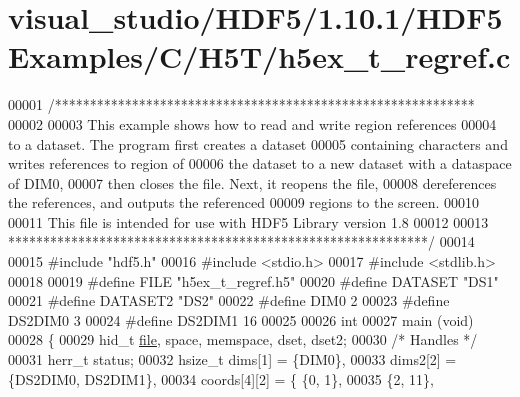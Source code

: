 \hypertarget{visual__studio_2_h_d_f5_21_810_81_2_h_d_f5_examples_2_c_2_h5_t_2h5ex__t__regref_8c_source}{}\section{visual\+\_\+studio/\+H\+D\+F5/1.10.1/\+H\+D\+F5\+Examples/\+C/\+H5\+T/h5ex\+\_\+t\+\_\+regref.c}
\label{visual__studio_2_h_d_f5_21_810_81_2_h_d_f5_examples_2_c_2_h5_t_2h5ex__t__regref_8c_source}

\begin{DoxyCode}
00001 \textcolor{comment}{/************************************************************}
00002 \textcolor{comment}{}
00003 \textcolor{comment}{  This example shows how to read and write region references}
00004 \textcolor{comment}{  to a dataset.  The program first creates a dataset}
00005 \textcolor{comment}{  containing characters and writes references to region of}
00006 \textcolor{comment}{  the dataset to a new dataset with a dataspace of DIM0,}
00007 \textcolor{comment}{  then closes the file.  Next, it reopens the file,}
00008 \textcolor{comment}{  dereferences the references, and outputs the referenced}
00009 \textcolor{comment}{  regions to the screen.}
00010 \textcolor{comment}{}
00011 \textcolor{comment}{  This file is intended for use with HDF5 Library version 1.8}
00012 \textcolor{comment}{}
00013 \textcolor{comment}{ ************************************************************/}
00014 
00015 \textcolor{preprocessor}{#include "hdf5.h"}
00016 \textcolor{preprocessor}{#include <stdio.h>}
00017 \textcolor{preprocessor}{#include <stdlib.h>}
00018 
00019 \textcolor{preprocessor}{#define FILE            "h5ex\_t\_regref.h5"}
00020 \textcolor{preprocessor}{#define DATASET         "DS1"}
00021 \textcolor{preprocessor}{#define DATASET2        "DS2"}
00022 \textcolor{preprocessor}{#define DIM0            2}
00023 \textcolor{preprocessor}{#define DS2DIM0         3}
00024 \textcolor{preprocessor}{#define DS2DIM1         16}
00025 
00026 \textcolor{keywordtype}{int}
00027 main (\textcolor{keywordtype}{void})
00028 \{
00029     hid\_t               \hyperlink{structfile}{file}, space, memspace, dset, dset2;
00030                                                     \textcolor{comment}{/* Handles */}
00031     herr\_t              status;
00032     hsize\_t             dims[1] = \{DIM0\},
00033                         dims2[2] = \{DS2DIM0, DS2DIM1\},
00034                         coords[4][2] = \{ \{0,  1\},
00035                                          \{2, 11\},

\end{DoxyCode}
